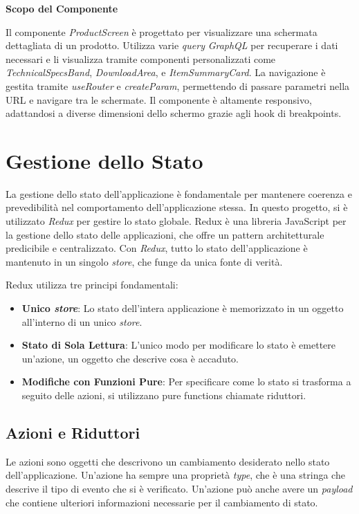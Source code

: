 \textbf{Scopo del Componente}

Il componente \textit{ProductScreen} è progettato per visualizzare una schermata dettagliata di un prodotto.
Utilizza varie \textit{query} \textit{GraphQL} per recuperare i dati necessari e li visualizza tramite componenti personalizzati come \textit{TechnicalSpecsBand}, \textit{DownloadArea}, e \textit{ItemSummaryCard}.
La navigazione è gestita tramite \textit{useRouter} e \textit{createParam}, permettendo di passare parametri nella URL e navigare tra le schermate.
Il componente è altamente responsivo, adattandosi a diverse dimensioni dello schermo grazie agli hook di breakpoints.


\section{Gestione dello Stato}
\label{subsec:gestione_stato}

La gestione dello stato dell'applicazione è fondamentale per mantenere coerenza e prevedibilità nel comportamento dell'applicazione stessa.
In questo progetto, si è utilizzato \textit{Redux} per gestire lo stato globale.
Redux è una libreria JavaScript per la gestione dello stato delle applicazioni, che offre un pattern architetturale predicibile e centralizzato.
Con \textit{Redux}, tutto lo stato dell'applicazione è mantenuto in un singolo \textit{store}, che funge da unica fonte di verità.

Redux utilizza tre principi fondamentali:
\begin{itemize}
    \item \textbf{Unico \textit{store}}: Lo stato dell'intera applicazione è memorizzato in un oggetto all'interno di un unico \textit{store}.
    \item \textbf{Stato di Sola Lettura}: L'unico modo per modificare lo stato è emettere un'azione, un oggetto che descrive cosa è accaduto.
    \item \textbf{Modifiche con Funzioni Pure}: Per specificare come lo stato si trasforma a seguito delle azioni, si utilizzano pure functions chiamate riduttori.
\end{itemize}

\subsection{Azioni e Riduttori}
\label{subsubsec:azioni_riduttori}

Le azioni sono oggetti che descrivono un cambiamento desiderato nello stato dell'applicazione.
Un'azione ha sempre una proprietà \textit{type}, che è una stringa che descrive il tipo di evento che si è verificato.
Un'azione può anche avere un \textit{payload} che contiene ulteriori informazioni necessarie per il cambiamento di stato.

